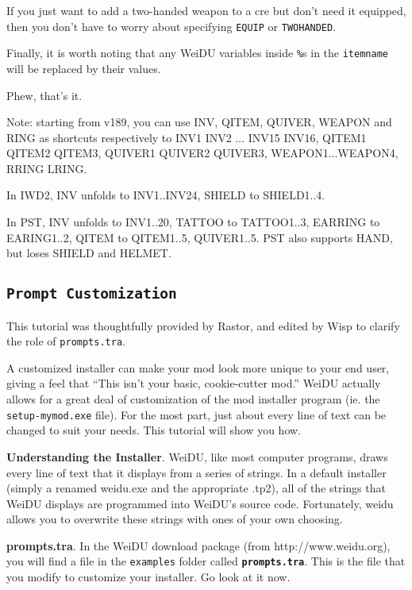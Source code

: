 \documentclass{article}
\def\DEFINE#1{{\tt \bf #1}\label{#1}\index{#1}}
\def\t#1{{\tt #1}}
\begin{document}
If you just want to add a two-handed weapon to a cre but don't need it
equipped, then you don't have to worry about specifying \t{EQUIP} or
\t{TWOHANDED}.

Finally, it is worth noting that any WeiDU variables inside \t{\%}s in the
\t{itemname} will be replaced by their values.

Phew, that's it.

Note: starting from v189, you can use INV, QITEM, QUIVER, WEAPON and RING as
shortcuts respectively
to INV1 INV2 ... INV15 INV16, QITEM1 QITEM2 QITEM3, QUIVER1 QUIVER2 QUIVER3,
WEAPON1...WEAPON4, RRING LRING.

In IWD2, INV unfolds to INV1..INV24, SHIELD to SHIELD1..4.

In PST, INV unfolds to INV1..20, TATTOO to TATTOO1..3, EARRING to EARING1..2,
QITEM to QITEM1..5, QUIVER1..5. PST also supports HAND, but loses SHIELD and
HELMET.

\subsection{\DEFINE{Prompt Customization}}
This tutorial was thoughtfully provided by Rastor, and edited by Wisp to
clarify the role of \t{prompts.tra}.

A customized installer can make your mod look more unique to your end user,
giving a feel that ``This isn't your basic, cookie-cutter mod.''  WeiDU
actually allows for a great deal of customization of the mod installer
program (ie. the \t{setup-mymod.exe} file).  For the most part, just about
every line of text can be changed to suit your needs.  This tutorial will
show you how.

{\bf Understanding the Installer}.
WeiDU, like most computer programs, draws every line of text that it
displays from a series of strings.  In a default installer (simply a
renamed weidu.exe and the appropriate .tp2), all of the strings that WeiDU
displays are programmed into WeiDU's source code.  Fortunately, weidu
allows you to overwrite these strings with ones of your own choosing.

{\bf prompts.tra}.
In the WeiDU download package (from http://www.weidu.org), you will find a
file in the \t{examples} folder called \DEFINE{prompts.tra}.  This is the
file that you modify to customize your installer. Go look at it now.
\end{document}
